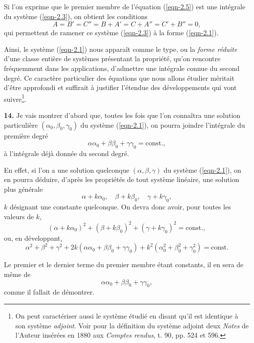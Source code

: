 Si l'on exprime que le premier membre de l'équation (\ref{eqn-2.5}) est une intégrale du système (\ref{eqn-2.3}), on 
obtient les conditions
\[
A = B' = C'' = B + A' = C + A'' = C' + B'' = 0,
\]
qui permettent de ramener ce système (\ref{eqn-2.3}) à la forme (\ref{eqn-2.1}).

Ainsi, le système (\ref{eqn-2.1}) nous apparaît comme le type, ou la \textit{forme réduite} d'une classe entière de 
systèmes présentant la propriété, qu'on rencontre fréquemment dans les applications, d'admettre une intégrale connue du 
second degré. Ce caractère particulier des équations que nous allons étudier méritait d'être approfondi et suffirait à 
justifier l'étendue des développements qui vont suivre\footnote{On peut caractériser aussi le système étudié en disant 
qu'il est identique à son système \textit{adjoint}. Voir pour la définition du système adjoint deux \textit{Notes} de 
l'Auteur insérées en 1880 aux \textit{Comptes rendus}, t. 90, pp. 524 et 596.}.

\textbf{14.} Je vais montrer d'abord que, toutes les fois que l'on connaîtra une solution particulière $(\alpha_0, 
\beta_0, \gamma_0)$ du système (\ref{eqn-2.1}), on pourra joindre l'intégrale du première degré
\[
\alpha\alpha_0 + \beta\beta_0 + \gamma\gamma_0 = \textrm{const.},
\]
à l'intégrale déjà donnée du second degré.

En effet, si l'on a une solution quelconque $(\alpha, \beta, \gamma)$ du système (\ref{eqn-2.1}), on en pourra déduire, 
d'après les propriétés de tout système linéaire, une solution plus générale
\[
\alpha + k\alpha_0, \quad \beta + k\beta_0, \quad \gamma + k\gamma_0,
\]
$k$ désignant une constante quelconque. On devra donc avoir, pour toutes les valeurs de $k$,
\[
(\alpha + k\alpha_0)^2 + (\beta + k\beta_0)^2 + (\gamma + k\gamma_0)^2 = \textrm{const.},
\]
ou, en développant,
\[
\alpha^2 + \beta^2 + \gamma^2 + 2k(\alpha\alpha_0 + \beta\beta_0 + \gamma\gamma_0) + k^2(\alpha_0^2 + \beta_0^2 + 
\gamma_0^2) = \textrm{const.}
\]

Le premier et le dernier terme du premier membre étant constants, il en sera de même de
\[
\alpha\alpha_0 + \beta\beta_0 + \gamma\gamma_0,
\]
comme il fallait de démontrer.

